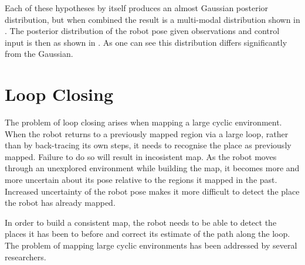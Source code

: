Each of these hypotheses by itself produces an almost Gaussian
posterior distribution, but when combined the result is a multi-modal
distribution shown in . The posterior
distribution of the robot pose given observations and control input is
then as shown in . As one can see this
distribution differs significantly from the Gaussian.




\section{Loop Closing}
\label{sec:back_loop}

The problem of loop closing arises when mapping a large cyclic
environment. When the robot returns to a previously mapped region via
a large loop, rather than by back-tracing its own steps, it needs to
recognise the place as previously mapped. Failure to do so will result
in incosistent map.  As the robot moves through an unexplored
environment while building the map, it becomes more and more uncertain
about its pose relative to the regions it mapped in the past.
Increased uncertainty of the robot pose makes it more difficult to
detect the place the robot has already mapped.


In order to build a consistent map, the robot needs to be able to
detect the places it has been to before and correct its estimate of
the path along the loop. The problem of mapping large cyclic
environments has been addressed by several researchers.


